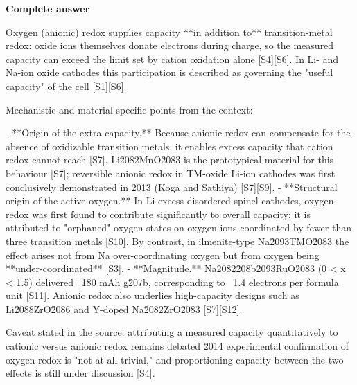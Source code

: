 \documentclass[10pt]{article}
\begin{document}
\textbf{Complete answer}
\begin{AnswerText}
Oxygen (anionic) redox supplies capacity **in addition to** transition-metal redox: oxide ions themselves donate electrons during charge, so the measured capacity can exceed the limit set by cation oxidation alone [S4][S6]. In Li- and Na-ion oxide cathodes this participation is described as governing the "useful capacity" of the cell [S1][S6].

Mechanistic and material-specific points from the context:

- **Origin of the extra capacity.** Because anionic redox can compensate for the absence of oxidizable transition metals, it enables excess capacity that cation redox cannot reach [S7]. Li\u2082MnO\u2083 is the prototypical material for this behaviour [S7]; reversible anionic redox in TM-oxide Li-ion cathodes was first conclusively demonstrated in 2013 (Koga and Sathiya) [S7][S9].
- **Structural origin of the active oxygen.** In Li-excess disordered spinel cathodes, oxygen redox was first found to contribute significantly to overall capacity; it is attributed to "orphaned" oxygen states on oxygen ions coordinated by fewer than three transition metals [S10]. By contrast, in ilmenite-type Na\u2093TMO\u2083 the effect arises not from Na over-coordinating oxygen but from oxygen being **under-coordinated** [S3].
- **Magnitude.** Na\u2082\u208b\u2093RuO\u2083 (0 < x < 1.5) delivered ~180 mAh g\u207b, corresponding to ~1.4 electrons per formula unit [S11]. Anionic redox also underlies high-capacity designs such as Li\u2088ZrO\u2086 and Y-doped Na\u2082ZrO\u2083 [S7][S12].

Caveat stated in the source: attributing a measured capacity quantitatively to cationic versus anionic redox remains debated \u2014 experimental confirmation of oxygen redox is "not at all trivial," and proportioning capacity between the two effects is still under discussion [S4].
\end{AnswerText}
\end{document}
